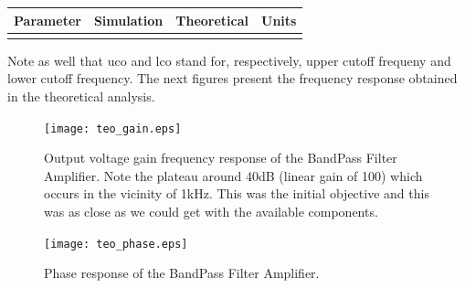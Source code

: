 \hfill
 \parbox{1\linewidth}{
  \centering
  \begin{tabular}{|l|l|l|r|}
    \hline    
    {\bf Parameter} & {\bf Simulation} & {\bf Theoretical } & {\bf Units }\\ \hline
    
  \label{tab:results}
  \end{tabular}
  }
  
  Note as well that uco and lco stand for, respectively, upper cutoff frequeny and lower cutoff frequency.
  The next figures present the frequency response obtained in the theoretical analysis.


\begin{figure}[H] \centering
\texttt{[image: teo\_gain.eps]}
\caption{Output voltage gain frequency response of the BandPass Filter Amplifier. Note the plateau around 40dB (linear gain of 100) which occurs in the vicinity of 1kHz. This was the initial objective and this was as close as we could get with the available components.}
\label{fig:gain_octa}
\end{figure}

\begin{figure}[H] \centering
\texttt{[image: teo\_phase.eps]}
\caption{Phase response of the BandPass Filter Amplifier.}
\label{fig:phase_octa}
\end{figure}



\pagebreak


